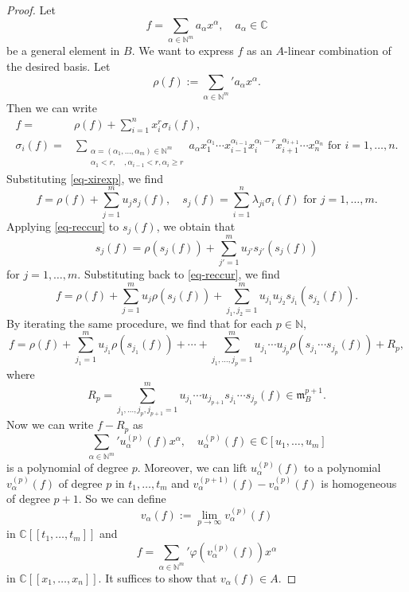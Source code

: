 \begin{proof}
    Let 
    \[
        f=\sum_{\alpha\in \mathbb{N}^m }a_{\alpha} x^{\alpha},\quad a_{\alpha}\in \mathbb{C}   
    \]
    be a general element in $B$. We want to express $f$ as an $A$-linear combination of the desired basis. Let 
    \[
        \rho(f):=\sum_{\alpha\in \mathbb{N}^m}' a_{\alpha}x^{\alpha}.  
    \]
    Then we can write
    \[
        \begin{aligned}
        f=&\rho(f)+\sum_{i=1}^n x_i^r \sigma_i(f),\\
        \sigma_i(f)=&\sum_{\substack{\alpha=(\alpha_1,\ldots,\alpha_m)\in \mathbb{N}^m \\ \alpha_1<r,\quad,\alpha_{i-1}<r,\alpha_i\geq r}} a_{\alpha}x_1^{\alpha_1}\cdots x_{i-1}^{\alpha_{i-1}}x_i^{\alpha_i-r}x_{i+1}^{\alpha_{i+1}}\cdots x_n^{\alpha_n}  \text{ for }i=1,\ldots,n.
        \end{aligned}
    \]
    Substituting \eqref{eq-xirexp}, we find
    \begin{equation}\label{eq-reccur}
        f=\rho(f)+\sum_{j=1}^m u_j s_j(f), \quad s_j(f)=\sum_{i=1}^n \lambda_{ji}\sigma_i(f)\text{ for }j=1,\ldots,m. 
    \end{equation}
    Applying \eqref{eq-reccur} to $s_j(f)$, we obtain that
    \[
        s_j(f) = \rho(s_j(f))+\sum_{j'=1}^m u_{j'}s_{j'}(s_j(f)) 
    \]
    for $j=1,\ldots,m$. Substituting back to \eqref{eq-reccur}, we find
    \[
        f=\rho(f)+\sum_{j=1}^m u_j \rho(s_j(f))+\sum_{j_1,j_2=1}^mu_{j_1}u_{j_2}s_{j_1}(s_{j_2}(f)).  
    \]
    By iterating the same procedure, we find that for each $p\in \mathbb{N}$,
    \[
        f=\rho(f)+\sum_{j_1=1}^m u_{j_1}\rho(s_{j_1}(f))+\cdots+\sum_{j_1,\ldots,j_p=1}^m u_{j_1}\cdots u_{j_p} \rho (s_{j_1}\cdots s_{j_p}(f) )+R_p,
    \]
    where
    \[
        R_p=  \sum_{j_1,\ldots,j_p,j_{p+1}=1}^m u_{j_1}\cdots u_{j_{p+1}} s_{j_1}\cdots s_{j_p}(f)\in \mathfrak{m}_B^{p+1}.
    \]
    Now we can write $f-R_p$ as
    \[
        \sum_{\alpha\in \mathbb{N}^m}' u^{(p)}_{\alpha}(f) x^{\alpha},\quad  u^{(p)}_{\alpha}(f)\in \mathbb{C}[u_1,\ldots,u_m] 
    \]
    is a polynomial of degree $p$. Moreover, we can lift $u^{(p)}_{\alpha}(f)$ to a polynomial $v^{(p)}_{\alpha}(f)$ of degree $p$ in $t_1,\ldots,t_m$ and $v^{(p+1)}_{\alpha}(f)-v^{(p)}_{\alpha}(f)$ is homogeneous of degree $p+1$. So we can define
    \[
        v_{\alpha}(f):=\lim_{p\to\infty} v^{(p)}_{\alpha}(f) 
    \]
    in $\mathbb{C}[[t_1,\ldots,t_m]]$ and
    \[
        f=\sum_{\alpha\in \mathbb{N}^m}' \varphi(v^{(p)}_{\alpha}(f)) x^{\alpha}
    \]
    in  $\mathbb{C}[[x_1,\ldots,x_n]]$.
    It suffices to show that $v_{\alpha}(f)\in A$. 


\end{proof}
